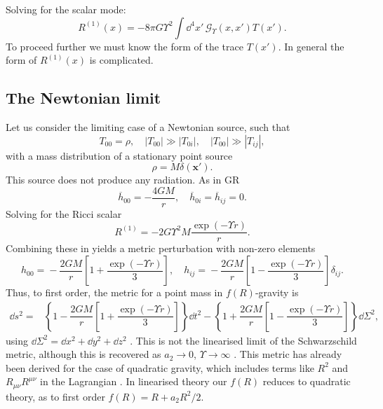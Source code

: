 Solving for the scalar mode:
\begin{equation}
R^{(1)}(x) = -8 \pi G \Upsilon^2 \int \dd^4 x'\, \mathscr{G}_\Upsilon(x, x') T(x').
\end{equation}
To proceed further we must know the form of the trace $T(x')$. In general the form of $R^{(1)}(x)$ is complicated.

\subsection{The Newtonian limit}

Let us consider the limiting case of a Newtonian source, such that
\begin{equation}
T_{00} = \rho, \quad |T_{00}| \gg |T_{0i}|, \quad |T_{00}| \gg |T_{ij}|,
\end{equation}
with a mass distribution of a stationary point source
\begin{equation}
\rho = M\delta(\boldsymbol{x'}).
\end{equation}
This source does not produce any radiation. As in GR
\begin{equation}
\overline{h}_{00} = -\dfrac{4GM}{r}, \quad \overline{h}_{0i} = \overline{h}_{ij} = 0.
\end{equation}
Solving for the Ricci scalar \citep{Havas1977}
\begin{equation}
R^{(1)} = -2 G \Upsilon^2 M \dfrac{\exp(- \Upsilon r)}{r}.
\end{equation}
Combining these in  yields a metric perturbation with non-zero elements 
\begin{equation}
h_{00} = {} -\dfrac{2GM}{r}\left[1 + \dfrac{\exp(- \Upsilon r)}{3}\right], \quad
h_{ij} = {} -\dfrac{2GM}{r}\left[1 - \dfrac{\exp(- \Upsilon r)}{3}\right]\delta_{ij}.
\end{equation}
Thus, to first order, the metric for a point mass in $f(R)$-gravity is
\begin{align}
\dd s^2 = {} & \left\{1-\dfrac{2GM}{r}\left[1 + \dfrac{\exp(- \Upsilon r)}{3}\right]\right\}\dd t^2 - \left\{1+\dfrac{2GM}{r}\left[1 - \dfrac{\exp(- \Upsilon r)}{3}\right]\right\}\dd \Sigma^2,
\label{eq:f(R)_Schw}
\end{align}
using $\dd \Sigma^2 = \dd x^2 + \dd y^2 + \dd z^2$ \citep{Capozziello2007, Capozziello2009a, Naf2010}. This is not the linearised limit of the Schwarzschild metric, although this is recovered as $a_2 \rightarrow 0$, $\Upsilon \rightarrow \infty$ \citep{Chiba2007a}. This metric has already been derived for the case of quadratic gravity, which includes terms like $R^2$ and $R_{\mu\nu}R^{\mu\nu}$ in the Lagrangian \citep{Pechlaner1966, Stelle1978, Schmidt1986, Teyssandier1990}. In linearised theory our $f(R)$ reduces to quadratic theory, as to first order $f(R) = R + a_2 R^2/2$.

